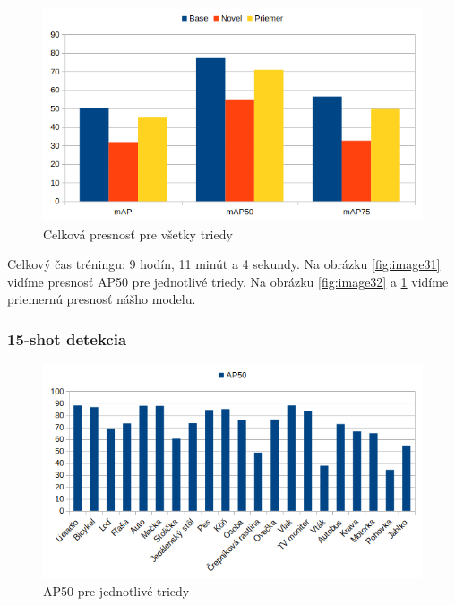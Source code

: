 \begin{figure}[H]
\includegraphics[width=\textwidth]{images/10_shot_meanAP.png}
\centering
\caption{Celková presnosť pre všetky triedy}
\label{fig:image33}
\end{figure}

Celkový čas tréningu: 9 hodín, 11 minút a 4 sekundy. Na obrázku \ref{fig:image31} vidíme presnosť AP50 pre jednotlivé triedy. Na obrázku \ref{fig:image32} a \ref{fig:image33} vidíme priemernú presnosť nášho modelu.

\subsubsection{15-shot detekcia}

\begin{figure}[H]
\includegraphics[width=\textwidth]{images/15_shot_classes_AP50.png}
\centering
\caption{AP50 pre jednotlivé triedy}
\label{fig:image34}
\end{figure}

